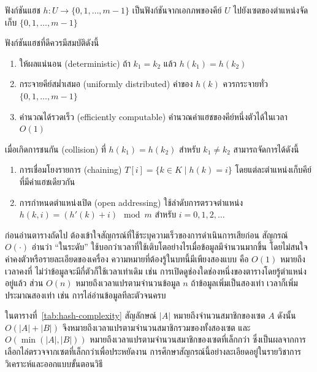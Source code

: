 \begin{definition}
ฟังก์ชันแฮช $h: U \rightarrow \{0, 1, \ldots, m-1\}$ เป็นฟังก์ชันจากเอกภพของคีย์ $U$ ไปยังเซตของตำแหน่งจัดเก็บ $\{0, 1, \ldots, m-1\}$

ฟังก์ชันแฮชที่ดีควรมีสมบัติดังนี้
\begin{enumerate}
    \item ให้ผลแน่นอน (deterministic) ถ้า $k_1 = k_2$ แล้ว $h(k_1) = h(k_2)$
    \item กระจายคีย์สม่ำเสมอ (uniformly distributed) ค่าของ $h(k)$ ควรกระจายทั่ว $\{0, 1, \ldots, m-1\}$
    \item คำนวณได้รวดเร็ว (efficiently computable) คำนวณค่าแฮชของคีย์หนึ่งตัวได้ในเวลา $O(1)$
\end{enumerate}

เมื่อเกิดการชนกัน (collision) ที่ $h(k_1) = h(k_2)$ สำหรับ $k_1 \neq k_2$ สามารถจัดการได้ดังนี้
\begin{enumerate}
    \item การเชื่อมโยงรายการ (chaining) $T[i] = \{k \in K \mid h(k) = i\}$ โดยแต่ละตำแหน่งเก็บคีย์ที่มีค่าแฮชเดียวกัน
    \item การกำหนดตำแหน่งเปิด (open addressing) ใช้ลำดับการตรวจตำแหน่ง $h(k, i) = (h'(k) + i) \mod m$ สำหรับ $i = 0, 1, 2, \ldots$
\end{enumerate}
\label{def:hash-function}
\end{definition}

ก่อนอ่านตารางถัดไป ต้องเข้าใจสัญกรณ์ที่ใช้ระบุความเร็วของการดำเนินการเสียก่อน สัญกรณ์ $O(\cdot)$ อ่านว่า ``ในระดับ'' ใช้บอกว่าเวลาที่ใช้เติบโตอย่างไรเมื่อข้อมูลมีจำนวนมากขึ้น โดยไม่สนใจค่าคงตัวหรือรายละเอียดของเครื่อง ความหมายที่ต้องรู้ในบทนี้มีเพียงสองแบบ คือ $O(1)$ หมายถึงเวลาคงที่ ไม่ว่าข้อมูลจะมีกี่ตัวก็ใช้เวลาเท่าเดิม เช่น การเปิดดูช่องใดช่องหนึ่งของตารางโดยรู้ตำแหน่งอยู่แล้ว ส่วน $O(n)$ หมายถึงเวลาแปรตามจำนวนข้อมูล $n$ ถ้าข้อมูลเพิ่มเป็นสองเท่า เวลาก็เพิ่มประมาณสองเท่า เช่น การไล่อ่านข้อมูลทีละตัวจนครบ

ในตารางที่~\ref{tab:hash-complexity} สัญลักษณ์ $|A|$ หมายถึงจำนวนสมาชิกของเซต $A$ ดังนั้น $O(|A| + |B|)$ จึงหมายถึงเวลาแปรตามจำนวนสมาชิกรวมของทั้งสองเซต และ $O(\min(|A|,|B|))$ หมายถึงเวลาแปรตามจำนวนสมาชิกของเซตที่เล็กกว่า ซึ่งเป็นผลจากการเลือกไล่ตรวจจากเซตที่เล็กกว่าเพื่อประหยัดงาน การศึกษาสัญกรณ์นี้อย่างละเอียดอยู่ในรายวิชาการวิเคราะห์และออกแบบขั้นตอนวิธี

